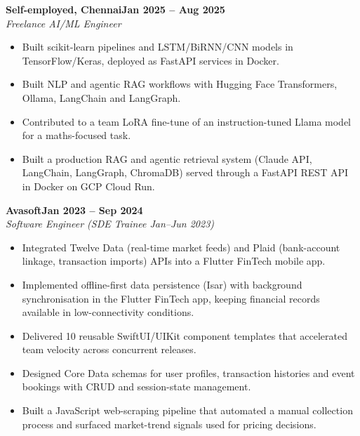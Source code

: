 \documentclass[a4paper,11pt]{article}
\newcommand{\entry}[4]{\needspace{4\baselineskip}\noindent\textbf{#1}\hfill\textbf{#2}\\ \textit{#3}\hfill\textit{#4}\par}
\begin{document}
\vspace{4pt}
\entry{Self-employed, Chennai}{Jan 2025 – Aug 2025}{Freelance AI/ML Engineer}{}
\begin{itemize}
  \item Built scikit-learn pipelines and LSTM/BiRNN/CNN models in TensorFlow/Keras, deployed as FastAPI services in Docker.
  \item Built NLP and agentic RAG workflows with Hugging Face Transformers, Ollama, LangChain and LangGraph.
  \item Contributed to a team LoRA fine-tune of an instruction-tuned Llama model for a maths-focused task.
  \item Built a production RAG and agentic retrieval system (Claude API, LangChain, LangGraph, ChromaDB) served through a FastAPI REST API in Docker on GCP Cloud Run.
\end{itemize}
\vspace{4pt}
\entry{Avasoft}{Jan 2023 – Sep 2024}{Software Engineer (SDE Trainee Jan–Jun 2023)}{}
\begin{itemize}
  \item Integrated Twelve Data (real-time market feeds) and Plaid (bank-account linkage, transaction imports) APIs into a Flutter FinTech mobile app.
  \item Implemented offline-first data persistence (Isar) with background synchronisation in the Flutter FinTech app, keeping financial records available in low-connectivity conditions.
  \item Delivered 10 reusable SwiftUI/UIKit component templates that accelerated team velocity across concurrent releases.
  \item Designed Core Data schemas for user profiles, transaction histories and event bookings with CRUD and session-state management.
  \item Built a JavaScript web-scraping pipeline that automated a manual collection process and surfaced market-trend signals used for pricing decisions.
\end{itemize}

\end{document}
